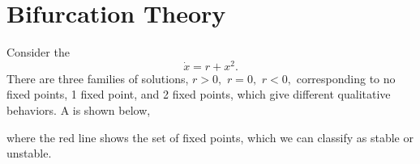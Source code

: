 \documentclass{article}
\numberwithin{equation}{section}
\begin{document}
\section{Bifurcation Theory}
Consider the 
\begin{equation*}
    \dot{x} = r + x^2.
\end{equation*}
There are three families of solutions, $r > 0,$ $r=0,$ $r<0,$ corresponding to no fixed points, 1 fixed point, and 2 fixed points, which give different qualitative behaviors. A  is shown below,
\begin{center}
\end{center}
where the red line shows the set of fixed points, which we can classify as stable or unstable.
\end{document}
